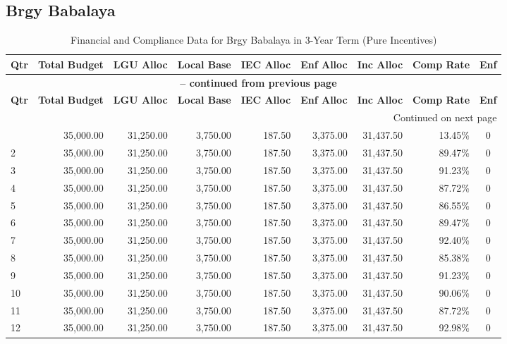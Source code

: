 \subsection{Brgy Babalaya}
\begin{longtable}{lrrrrrrrc}
\caption{Financial and Compliance Data for Brgy Babalaya in 3-Year Term (Pure Incentives)} \\
\toprule
\textbf{Qtr} & \textbf{Total Budget} & \textbf{LGU Alloc} & \textbf{Local Base} & \textbf{IEC Alloc} & \textbf{Enf Alloc} & \textbf{Inc Alloc} & \textbf{Comp Rate} & \textbf{Enf} \\
\midrule
\endfirsthead
\multicolumn{9}{c}{{\bfseries \tablename\ \thetable{} -- continued from previous page}} \\
\toprule
\textbf{Qtr} & \textbf{Total Budget} & \textbf{LGU Alloc} & \textbf{Local Base} & \textbf{IEC Alloc} & \textbf{Enf Alloc} & \textbf{Inc Alloc} & \textbf{Comp Rate} & \textbf{Enf} \\
\midrule
\endhead
\hline \multicolumn{9}{r}{{Continued on next page}} \\ \hline
\endfoot
\bottomrule
\endlastfoot
1 & 35,000.00 & 31,250.00 & 3,750.00 & 187.50 & 3,375.00 & 31,437.50 & 13.45\% & 0 \\
2 & 35,000.00 & 31,250.00 & 3,750.00 & 187.50 & 3,375.00 & 31,437.50 & 89.47\% & 0 \\
3 & 35,000.00 & 31,250.00 & 3,750.00 & 187.50 & 3,375.00 & 31,437.50 & 91.23\% & 0 \\
4 & 35,000.00 & 31,250.00 & 3,750.00 & 187.50 & 3,375.00 & 31,437.50 & 87.72\% & 0 \\
5 & 35,000.00 & 31,250.00 & 3,750.00 & 187.50 & 3,375.00 & 31,437.50 & 86.55\% & 0 \\
6 & 35,000.00 & 31,250.00 & 3,750.00 & 187.50 & 3,375.00 & 31,437.50 & 89.47\% & 0 \\
7 & 35,000.00 & 31,250.00 & 3,750.00 & 187.50 & 3,375.00 & 31,437.50 & 92.40\% & 0 \\
8 & 35,000.00 & 31,250.00 & 3,750.00 & 187.50 & 3,375.00 & 31,437.50 & 85.38\% & 0 \\
9 & 35,000.00 & 31,250.00 & 3,750.00 & 187.50 & 3,375.00 & 31,437.50 & 91.23\% & 0 \\
10 & 35,000.00 & 31,250.00 & 3,750.00 & 187.50 & 3,375.00 & 31,437.50 & 90.06\% & 0 \\
11 & 35,000.00 & 31,250.00 & 3,750.00 & 187.50 & 3,375.00 & 31,437.50 & 87.72\% & 0 \\
12 & 35,000.00 & 31,250.00 & 3,750.00 & 187.50 & 3,375.00 & 31,437.50 & 92.98\% & 0 \\
\end{longtable}
\newpage
